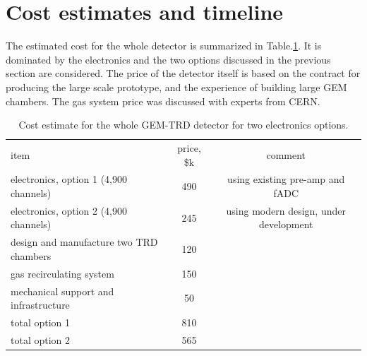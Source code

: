 \documentclass[%
preprint,
nofootinbib,
 amsmath,amssymb,
 aps,
floatfix,
]{revtex4-1}
\begin{document}
\section{Cost estimates and timeline}
\label{sec:time}
The estimated cost for the whole detector is summarized in Table.\ref{tab:cost}.
It is dominated by the electronics and the two options discussed
in the previous section are considered.
The price of the detector itself is based on the contract for producing the large scale 
prototype, and the experience of building large GEM chambers.
The gas system price was discussed with experts from CERN.
\begin{table}[h!]
\begin{ruledtabular}
\begin{tabular}{lcc}
\textrm{item}&
\textrm{price, \$k}&
\textrm{comment}\\
\colrule
electronics, option 1 (4,900 channels) & 490 & using existing pre-amp and fADC \\
electronics, option 2 (4,900 channels) & 245 & using modern design, under development \\
design and manufacture two TRD chambers  & 120 & \\
gas recirculating system  & 150 & \\
mechanical support and infrastructure  & 50 & \\
\colrule
total option 1 & 810 & \\
total option 2 & 565 & \\
\end{tabular}
\end{ruledtabular}
\caption{
Cost estimate for the whole GEM-TRD detector for two electronics options.
\label{tab:cost}
}
\end{table}
\end{document}
